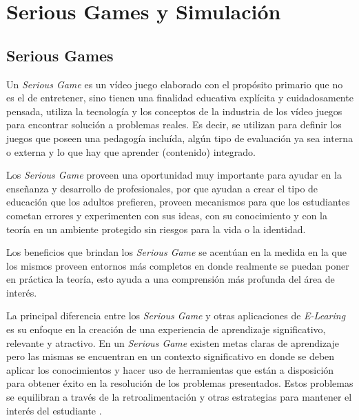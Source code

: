 
\section{Serious Games y Simulación}

\subsection{Serious Games}

Un \emph{Serious Game} es un vídeo juego elaborado con el propósito primario que
no es el de entretener\cite{sg:aoverview}, sino tienen una finalidad educativa
explícita y cuidadosamente pensada, utiliza la tecnología y los conceptos de la
industria de los vídeo juegos para encontrar solución a problemas reales. Es
decir, se utilizan para definir los juegos que poseen una pedagogía incluída,
algún tipo de evaluación ya sea interna o externa y lo que hay que aprender
(contenido) integrado\cite{damien:sg}.

Los \emph{Serious Game} proveen una oportunidad muy importante para ayudar en la
enseñanza y desarrollo de profesionales, por que ayudan a crear el tipo de
educación que los adultos prefieren, proveen mecanismos para que los estudiantes
cometan errores y experimenten con sus ideas, con su conocimiento y con la
teoría en un ambiente protegido sin riesgos para la vida o la identidad. 

Los beneficios que brindan los \emph{Serious Game} se acentúan en la medida en
la que los mismos proveen entornos más completos en donde realmente se puedan
poner en práctica la teoría, esto ayuda a una comprensión más profunda del área
de interés.

La principal diferencia entre los \emph{Serious Game} y otras aplicaciones de
\emph{E-Learing} es su enfoque en la creación de una experiencia de aprendizaje
significativo, relevante y atractivo. En un \emph{Serious Game} existen metas
claras de aprendizaje pero las mismas se encuentran en un contexto significativo
en donde se deben aplicar los conocimientos y hacer uso de herramientas que
están a disposición para obtener éxito en la resolución de los problemas
presentados. Estos problemas se equilibran a través de la retroalimentación y
otras estrategias para mantener el interés del estudiante
\cite{papertian:const}.


